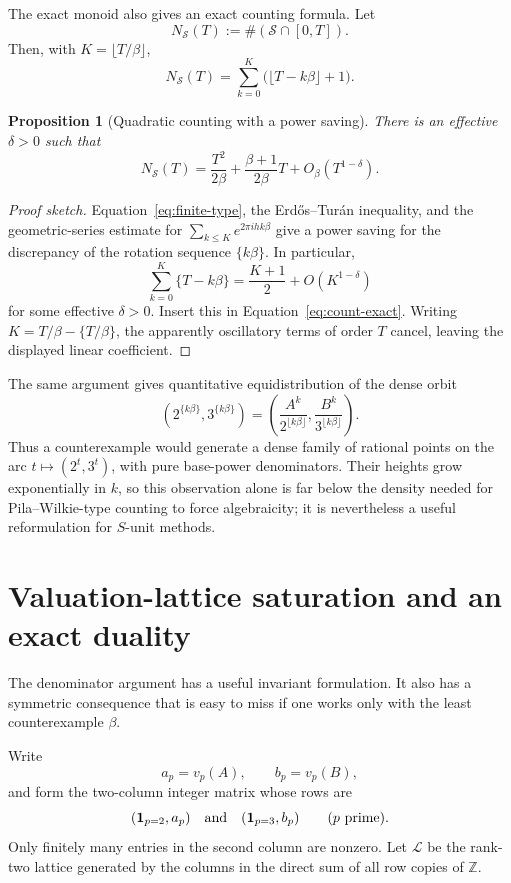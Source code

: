 \documentclass[11pt]{article}
\newtheorem{proposition}[theorem]{Proposition}
\theoremstyle{definition}
\begin{document}
The exact monoid also gives an exact counting formula.  Let
\[
  N_{\mathcal S}(T):=\#(\mathcal S\cap[0,T]).
\]
Then, with $K=\lfloor T/\beta\rfloor$,
\begin{equation}\label{eq:count-exact}
 N_{\mathcal S}(T)=\sum_{k=0}^{K}\bigl(\lfloor T-k\beta\rfloor+1\bigr).
\end{equation}

\begin{proposition}[Quadratic counting with a power saving]\label{prop:count}
There is an effective $\delta>0$ such that
\[
 N_{\mathcal S}(T)=\frac{T^2}{2\beta}
 +\frac{\beta+1}{2\beta}T+O_\beta(T^{1-\delta}).
\]
\end{proposition}
\begin{proof}[Proof sketch]
Equation~\eqref{eq:finite-type}, the Erd\H{o}s--Tur\'an inequality, and the
geometric-series estimate for $\sum_{k\le K}e^{2\pi i h k\beta}$ give a power
saving for the discrepancy of the rotation sequence $\{k\beta\}$.  In
particular,
\[
 \sum_{k=0}^{K}\{T-k\beta\}=\frac{K+1}{2}+O(K^{1-\delta})
\]
for some effective $\delta>0$.  Insert this in
Equation~\eqref{eq:count-exact}.  Writing $K=T/\beta-\{T/\beta\}$, the
apparently oscillatory terms of order $T$ cancel, leaving the displayed linear
coefficient.
\end{proof}

The same argument gives quantitative equidistribution of the dense orbit
\[
 \left(2^{\{k\beta\}},3^{\{k\beta\}}\right)
 =\left(\frac{A^k}{2^{\lfloor k\beta\rfloor}},
         \frac{B^k}{3^{\lfloor k\beta\rfloor}}\right).
\]
Thus a counterexample would generate a dense family of rational points on the
arc $t\mapsto(2^t,3^t)$, with pure base-power denominators.  Their heights grow
exponentially in $k$, so this observation alone is far below the density needed
for Pila--Wilkie-type counting to force algebraicity; it is nevertheless a
useful reformulation for $S$-unit methods.


\section{Valuation-lattice saturation and an exact duality}
\label{sec:saturation-duality}

The denominator argument has a useful invariant formulation.  It also has a
symmetric consequence that is easy to miss if one works only with the least
counterexample $\beta$.

Write
\[
 a_p=v_p(A),\qquad b_p=v_p(B),
\]
and form the two-column integer matrix whose rows are
\[
  (\mathbf 1_{p=2},a_p)
  \quad\hbox{and}\quad
  (\mathbf 1_{p=3},b_p)
  \qquad (p\text{ prime}).
\]
Only finitely many entries in the second column are nonzero.  Let
$\mathcal L$ be the rank-two lattice generated by the columns in the direct
sum of all row copies of $\mathbb Z$.
\end{document}
